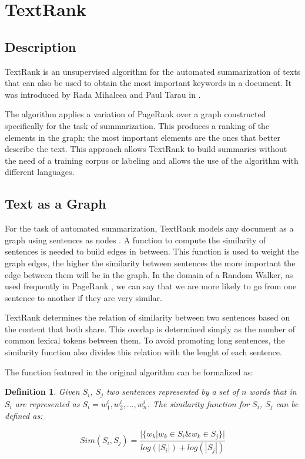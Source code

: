 \documentclass{llncs}
\newtheorem{definicion}{Definition}
\begin{document}
\section{TextRank}

\subsection{Description}
TextRank is an unsupervised algorithm for the automated summarization of texts that can also be used to obtain the most important keywords in a document. It was introduced by Rada Mihalcea and Paul Tarau in \cite{mihalcea-tarau}.

The algorithm applies a variation of PageRank \cite{pageetal98} over a graph constructed specifically for the task of summarization. This produces a ranking of the elements in the graph: the most important elements are the ones that better describe the text. This approach allows TextRank to build summaries without the need of a training corpus or labeling and allows the use of the algorithm with different languages.

\subsection{Text as a Graph}
For the task of automated summarization, TextRank models any document as a graph using sentences as nodes \cite{introductionir}. A function to compute the similarity of sentences is needed to build edges in between. This function is used to weight the graph edges, the higher the similarity between sentences the more important the edge between them will be in the graph. In the domain of a Random Walker, as used frequently in PageRank \cite{pageetal98}, we can say that we are more likely to go from one sentence to another if they are very similar. 

TextRank determines the relation of similarity between two sentences based on the content that both share. This overlap is determined simply as the number of common lexical tokens between them. To avoid promoting long sentences, the similarity function also divides this relation with the lenght of each sentence.

The function featured in the original algorithm can be formalized as:

\begin{definicion}
Given $S_i$, $S_j$ two sentences represented by a set of $n$ words that in 
$S_i$ are represented as $S_i = w_{1}^{i}, w_{2}^{i},..., w_{n}^{i}$. The similarity function for $S_i$, $S_j$ can be defined as:


\begin{equation}
Sim(S_{i},S_{j}) = \frac{ | \{   w_{k} | w_{k} \in S_{i} \& w_{k} \in S_{j}   \}  | }    
                              {  log(|S_{i}|) + log(|S_{j}|)  }
\end{equation}


\end{definicion}
\end{document}
